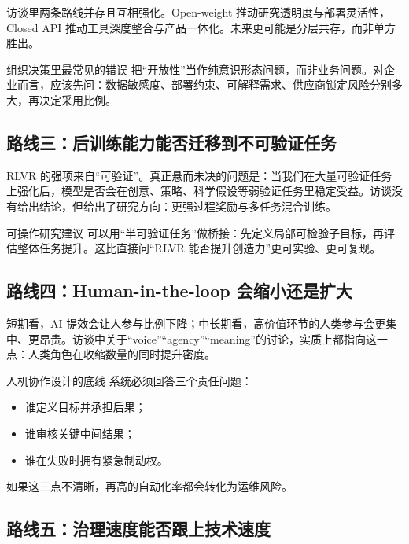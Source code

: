 \documentclass[a4paper]{article}
\begin{document}
访谈里两条路线并存且互相强化。Open-weight 推动研究透明度与部署灵活性，Closed API 推动工具深度整合与产品一体化。未来更可能是分层共存，而非单方胜出。

\begin{warningbox}{组织决策里最常见的错误}
把“开放性”当作纯意识形态问题，而非业务问题。对企业而言，应该先问：数据敏感度、部署约束、可解释需求、供应商锁定风险分别多大，再决定采用比例。
\end{warningbox}

\subsection{路线三：后训练能力能否迁移到不可验证任务}

RLVR 的强项来自“可验证”。真正悬而未决的问题是：当我们在大量可验证任务上强化后，模型是否会在创意、策略、科学假设等弱验证任务里稳定受益。访谈没有给出结论，但给出了研究方向：更强过程奖励与多任务混合训练。

\begin{knowledgebox}{可操作研究建议}
可以用“半可验证任务”做桥接：先定义局部可检验子目标，再评估整体任务提升。这比直接问“RLVR 能否提升创造力”更可实验、更可复现。
\end{knowledgebox}

\subsection{路线四：Human-in-the-loop 会缩小还是扩大}

短期看，AI 提效会让人参与比例下降；中长期看，高价值环节的人类参与会更集中、更昂贵。访谈中关于“voice”“agency”“meaning”的讨论，实质上都指向这一点：人类角色在收缩数量的同时提升密度。

\begin{importantbox}{人机协作设计的底线}
系统必须回答三个责任问题：
\begin{itemize}[leftmargin=1.5em]
    \item 谁定义目标并承担后果；
    \item 谁审核关键中间结果；
    \item 谁在失败时拥有紧急制动权。
\end{itemize}
如果这三点不清晰，再高的自动化率都会转化为运维风险。
\end{importantbox}

\subsection{路线五：治理速度能否跟上技术速度}
\end{document}

